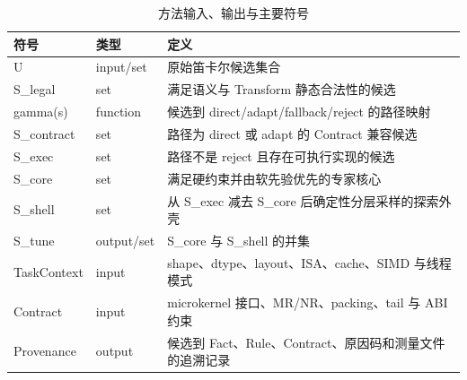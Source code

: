 \begin{table}[htbp]
  \centering
  \caption{方法输入、输出与主要符号}
  \label{tab:chapter4-symbols}
  \begin{tabular}{p{}p{}p{}}
    \toprule
    符号 & 类型 & 定义 \\
    \midrule
    U & input/set & 原始笛卡尔候选集合 \\
    S\_legal & set & 满足语义与 Transform 静态合法性的候选 \\
    gamma(s) & function & 候选到 direct/adapt/fallback/reject 的路径映射 \\
    S\_contract & set & 路径为 direct 或 adapt 的 Contract 兼容候选 \\
    S\_exec & set & 路径不是 reject 且存在可执行实现的候选 \\
    S\_core & set & 满足硬约束并由软先验优先的专家核心 \\
    S\_shell & set & 从 S\_exec 减去 S\_core 后确定性分层采样的探索外壳 \\
    S\_tune & output/set & S\_core 与 S\_shell 的并集 \\
    TaskContext & input & shape、dtype、layout、ISA、cache、SIMD 与线程模式 \\
    Contract & input & microkernel 接口、MR/NR、packing、tail 与 ABI 约束 \\
    Provenance & output & 候选到 Fact、Rule、Contract、原因码和测量文件的追溯记录 \\
    \bottomrule
  \end{tabular}
\end{table}
